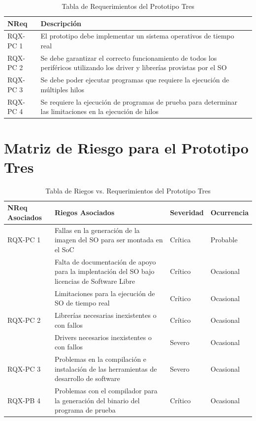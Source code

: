 		\begin{table}[h!]
		\centering		
		\begin{tabular}{ p{2.5cm} p{8cm} p{3cm} }
		\hline 
		\rowcolor[gray]{0.8} N\textordmasculine Req & Descripción\\
		\hline 
		RQX-PC 1 & El prototipo debe implementar un sistema operativos de tiempo real\\ 
		\hline 
		RQX-PC 2 & Se debe garantizar el correcto funcionamiento de todos los periféricos utilizando los driver y librerías provistas por el SO \\ 
		\hline 
		RQX-PC 3 & Se debe poder ejecutar programas que requiere la ejecución de múltiples hilos  \\ 
		\hline
		RQX-PC 4 & Se requiere la ejecución de programas de prueba para determinar las limitaciones en la ejecución de hilos \\ 
		\hline		
		\end{tabular}
		\caption{Tabla de Requerimientos del Prototipo Tres}
		\end{table}
		

		\section{Matriz de Riesgo para el Prototipo Tres} 

		\begin{table}[h!]
		\centering
		\begin{tabular}{ p{2.5cm} p{9cm} p{2cm} p{2cm} }
		\hline 
		\rowcolor[gray]{0.8} N\textordmasculine Req Asociados& Riegos Asociados & Severidad  & Ocurrencia \\
		\hline
		RQX-PC 1& Fallas en la generación de la imagen del SO para ser montada en el SoC & Crítica       & Probable \\
		\hline				
				& Falta de documentación de apoyo para la implentación del SO bajo licencias de Software Libre & Crítico & Ocasional\\	
		\hline				
				 & Limitaciones para la ejecución de SO de tiempo real & Crítico & Ocasional\\	
 		
 		\hline	
		RQX-PC 2 	& Librerías necesarias inexistentes o con fallos& Crítico & Ocasional\\	
		
		\hline				
 					 & Drivers necesarios inexistentes o con fallos  & Severo  &  Ocasional\\ 
		\hline	
 		RQX-PC 3	&Problemas en la compilación e instalación de las herramientas de desarrollo de software& Severo  &  Ocasional\\ 
		\hline
		RQX-PB 4 & Problemas con el compilador para la generación del binario del programa de prueba  & Crítico&  Ocasional\\
		\hline
		\end{tabular}
		\caption{Tabla de Riegos vs. Requerimientos del Prototipo Tres}
		\end{table}

